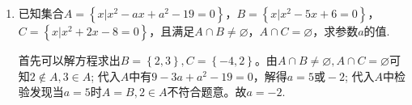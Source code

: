 \begin{enumerate}
\begin{enumerate}
        \begin{jieda}
            $A = \left\{(x, y) | y=x+1, x, y \in \mathbf{R}, 且x \neq 2\right\}$, 因此$A \subsetneqq B$. $(2, 3) \in B \mbox{且} (2, 3) \notin A$，故选C。
        \end{jieda}
        \item 已知集合$A = \left\{x | x^2 - ax + a^2 - 19 = 0\right\}$，$B = \left\{x|x^2-5x+6=0\right\}$，\\
        $C = \left\{x | x^2 + 2x - 8 = 0\right\}$，且满足$A \cap B \neq \varnothing$，$A \cap C = \varnothing$，求参数$a$的值.
        \begin{jieda}
            首先可以解方程求出$B = \left\{2,3\right\}, C = \left\{-4,2\right\}$。由$A \cap B \neq \varnothing, A \cap C = \varnothing$可知$2 \notin A, 3 \in A$; 代入$A$中有$9 - 3a + a^2 - 19 = 0$，解得$a = 5 \mbox{或} -2$; 代入$A$中检验发现当$a = 5$时$A = B, 2 \in A$不符合题意。故$a = -2$.
        \end{jieda}
    \end{enumerate}
\end{enumerate}
